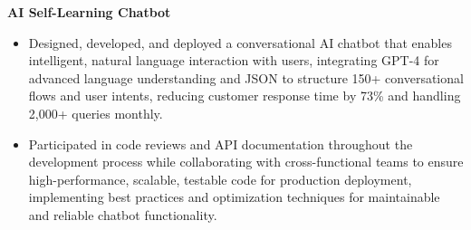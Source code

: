 \documentclass[a4paper,10pt]{article}
\begin{document}
\vspace{-2mm}
\textbf{AI Self-Learning Chatbot} \\
\begin{itemize}[leftmargin=*, itemsep=0pt, parsep=1pt]
\vspace{-7mm}
    \item Designed, developed, and deployed a conversational AI chatbot that enables intelligent, natural language interaction with users, integrating GPT-4 for advanced language understanding and JSON to structure 150+ conversational flows and user intents, reducing customer response time by 73\% and handling 2,000+ queries monthly.
    \item Participated in code reviews and API documentation throughout the development process while collaborating with cross-functional teams to ensure high-performance, scalable, testable code for production deployment, implementing best practices and optimization techniques for maintainable and reliable chatbot functionality.
\end{itemize}

\vspace{-2mm}
\end{document}
